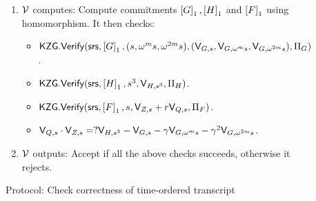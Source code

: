 \begin{figure}[htbp]
\begin{mdframed}
{\begin{enumerate}[leftmargin=2em]
\begin{itemize}[leftmargin=2em]
            \end{itemize}
            \item $\verifier$ computes: Compute commitments $\gone{G},\gone{H}$ and $\gone{F}$ using homomorphism. It then checks:
            \begin{itemize}[leftmargin=2em]
                \item $\kzgverify(\srs,\gone{G},(s,\omega^m s, \omega^{2m}s), (\val{s}{G}, \val{\omega^m s}{G}, \val{\omega^{2m} s}{G}),\Pi_G)$.
                \item $\kzgverify(\srs,\gone{H}, s^3, \val{s^3}{H},\Pi_H)$.
                \item $\kzgverify(\srs,\gone{F}, s, \val{s}{Z} + r\val{s}{Q}, \Pi_F)$.
                \item $\val{s}{Q}\cdot \val{s}{Z} =? \val{s^3}{H}-\val{s}{G}-\gamma \val{\omega^m s}{G}-\gamma^2\val{\omega^{2m}s}{G}$.
            \end{itemize}
            \item $\verifier$ outputs: Accept if all the above checks succeeds, otherwise it rejects.
        \end{enumerate}
    }
    \end{mdframed}
    \vspace*{-5mm}
    \caption{Protocol: Check correctness of time-ordered transcript}
    \label{fig:time-ordered-transcript}
\end{figure}

